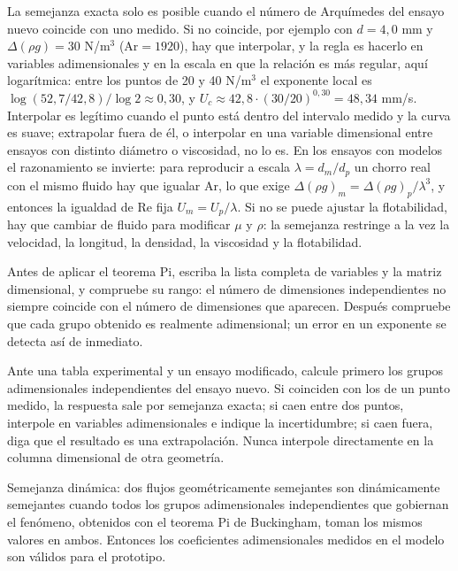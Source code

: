 \documentclass[10pt,openany]{book}
\begin{document}
La semejanza exacta solo es posible cuando el número de Arquímedes del ensayo nuevo coincide con uno medido. Si no coincide, por ejemplo con \(d = 4{,}0\) mm y \(\Delta(\rho g) = 30\) N/m\(^3\) (\(\mathrm{Ar} = 1920\)), hay que interpolar, y la regla es hacerlo en variables adimensionales y en la escala en que la relación es más regular, aquí logarítmica: entre los puntos de 20 y 40 N/m\(^3\) el exponente local es \(\log(52{,}7/42{,}8)/\log 2 \approx 0{,}30\), y \(U_c \approx 42{,}8\cdot(30/20)^{0{,}30} = 48{,}34\) mm/s. Interpolar es legítimo cuando el punto está dentro del intervalo medido y la curva es suave; extrapolar fuera de él, o interpolar en una variable dimensional entre ensayos con distinto diámetro o viscosidad, no lo es. En los ensayos con modelos el razonamiento se invierte: para reproducir a escala \(\lambda = d_m/d_p\) un chorro real con el mismo fluido hay que igualar \(\mathrm{Ar}\), lo que exige \(\Delta(\rho g)_m = \Delta(\rho g)_p/\lambda^{3}\), y entonces la igualdad de \(\mathrm{Re}\) fija \(U_m = U_p/\lambda\). Si no se puede ajustar la flotabilidad, hay que cambiar de fluido para modificar \(\mu\) y \(\rho\): la semejanza restringe a la vez la velocidad, la longitud, la densidad, la viscosidad y la flotabilidad.

\begin{tcolorbox}[title={Consejo}, studiumtip, breakable]

Antes de aplicar el teorema Pi, escriba la lista completa de variables y la matriz dimensional, y compruebe su rango: el número de dimensiones independientes no siempre coincide con el número de dimensiones que aparecen. Después compruebe que cada grupo obtenido es realmente adimensional; un error en un exponente se detecta así de inmediato.

Ante una tabla experimental y un ensayo modificado, calcule primero los grupos adimensionales independientes del ensayo nuevo. Si coinciden con los de un punto medido, la respuesta sale por semejanza exacta; si caen entre dos puntos, interpole en variables adimensionales e indique la incertidumbre; si caen fuera, diga que el resultado es una extrapolación. Nunca interpole directamente en la columna dimensional de otra geometría.
\end{tcolorbox}

\begin{tcolorbox}[title={Definición}, studiumdef, breakable]

Semejanza dinámica: dos flujos geométricamente semejantes son dinámicamente semejantes cuando todos los grupos adimensionales independientes que gobiernan el fenómeno, obtenidos con el teorema Pi de Buckingham, toman los mismos valores en ambos. Entonces los coeficientes adimensionales medidos en el modelo son válidos para el prototipo.
\end{tcolorbox}
\end{document}
